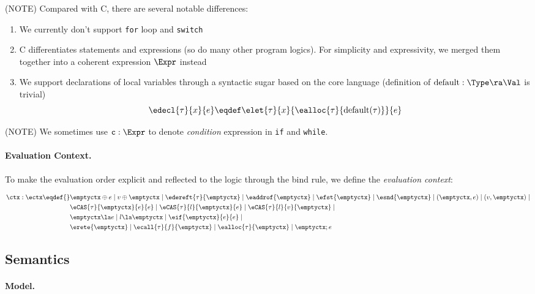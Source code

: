 (NOTE) Compared with C, there are several notable differences:
\begin{enumerate}
  \item We currently don't support \texttt{for} loop and \texttt{switch}
  \item C differentiates statements and expressions (so do many other program logics). For simplicity and
    expressivity, we merged them together into a coherent expression $\Expr$ instead
  \item We support declarations of local variables through a syntactic sugar based on the core language
        (definition of $\mathrm{default}: \Type \ra \Val$ is trivial)
        \[ \edecl{\tau}{x}{e} \eqdef \elet{\tau}{x}{\ealloc{\tau}{\mathrm{default}(\tau)}}{e}\]
\end{enumerate}

(NOTE) We sometimes use $\texttt{c} : \Expr$ to denote \emph{condition} expression
       in \texttt{if} and \texttt{while}.

\paragraph{Evaluation Context.}

To make the evaluation order explicit and reflected to the logic through the bind rule,
we define the \emph{evaluation context}:

\begin{align*}
    \ctx : \ectx \eqdef{}&
        \emptyctx \oplus e \mid
        v \oplus \emptyctx \mid
        \edereft{\tau}{\emptyctx} \mid
        \eaddrof{\emptyctx} \mid
        \efst{\emptyctx} \mid
        \esnd{\emptyctx} \mid
        (\emptyctx, e) \mid
        (v, \emptyctx) \mid
        \\&
        \eCAS{\tau}{\emptyctx}{e}{e} \mid
        \eCAS{\tau}{l}{\emptyctx}{e} \mid
        \eCAS{\tau}{l}{v}{\emptyctx} \mid
        \\&
        \emptyctx \la e \mid
        l \la \emptyctx \mid
        \eif{\emptyctx}{e}{e} \mid
        \\&
        \erete{\emptyctx} \mid
        \ecall{\tau}{f}{\emptyctx} \mid
        \ealloc{\tau}{\emptyctx} \mid
        \emptyctx ; e
\end{align*}

\subsection{Semantics}\label{sec:semantics}
\paragraph{Model.}

